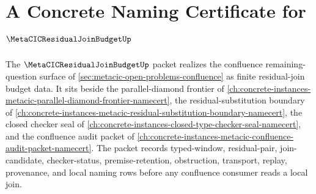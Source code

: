 \chapter{A Concrete Naming Certificate for $\MetaCICResidualJoinBudgetUp$}
\label{ch:concrete-instances-metacic-residual-join-budget-namecert}

The $\MetaCICResidualJoinBudgetUp$ packet realizes the confluence remaining-question surface of \autoref{sec:metacic-open-problems-confluence} as finite residual-join budget data. It sits beside the parallel-diamond frontier of \autoref{ch:concrete-instances-metacic-parallel-diamond-frontier-namecert}, the residual-substitution boundary of \autoref{ch:concrete-instances-metacic-residual-substitution-boundary-namecert}, the closed checker seal of \autoref{ch:concrete-instances-closed-type-checker-seal-namecert}, and the confluence audit packet of \autoref{ch:concrete-instances-metacic-confluence-audit-packet-namecert}. The packet records typed-window, residual-pair, join-candidate, checker-status, premise-retention, obstruction, transport, replay, provenance, and local naming rows before any confluence consumer reads a local join.

